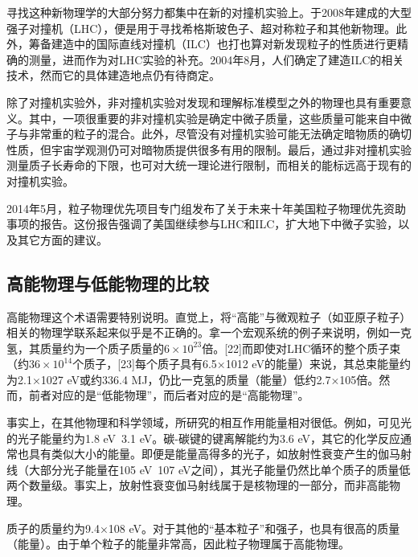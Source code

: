 寻找这种新物理学的大部分努力都集中在新的对撞机实验上。于2008年建成的大型强子对撞机（LHC），便是用于寻找希格斯玻色子、超对称粒子和其他新物理。此外，筹备建造中的国际直线对撞机（ILC）也打也算对新发现粒子的性质进行更精确的测量，进而作为对LHC实验的补充。2004年8月，人们确定了建造ILC的相关技术，然而它的具体建造地点仍有待商定。

除了对撞机实验外，非对撞机实验对发现和理解标准模型之外的物理也具有重要意义。其中，一项很重要的非对撞机实验是确定中微子质量，这些质量可能来自中微子与非常重的粒子的混合。此外，尽管没有对撞机实验可能无法确定暗物质的确切性质，但宇宙学观测仍可对暗物质提供很多有用的限制。最后，通过非对撞机实验测量质子长寿命的下限，也可对大统一理论进行限制，而相关的能标远高于现有的对撞机实验。

2014年5月，粒子物理优先项目专门组发布了关于未来十年美国粒子物理优先资助事项的报告。这份报告强调了美国继续参与LHC和ILC，扩大地下中微子实验，以及其它方面的建议。

\subsection{高能物理与低能物理的比较}
高能物理这个术语需要特别说明。直觉上，将“高能”与微观粒子（如亚原子粒子）相关的物理学联系起来似乎是不正确的。拿一个宏观系统的例子来说明，例如一克氢，其质量约为一个质子质量的$6\times10^{23}$倍。[22]而即使对LHC循环的整个质子束（约3$6\times10^{14}$个质子，[23]每个质子具有6.5×1012 eV的能量）来说，其总束能量约为2.1×1027 eV或约336.4 MJ，仍比一克氢的质量（能量）低约2.7×105倍。然而，前者对应的是“低能物理”，而后者对应的是“高能物理”。

事实上，在其他物理和科学领域，所研究的相互作用能量相对很低。例如，可见光的光子能量约为1.8 eV~3.1 eV。碳-碳键的键离解能约为3.6 eV，其它的化学反应通常也具有类似大小的能量。即便是能量高得多的光子，如放射性衰变产生的伽马射线（大部分光子能量在105 eV~107 eV之间），其光子能量仍然比单个质子的质量低两个数量级。事实上，放射性衰变伽马射线属于是核物理的一部分，而非高能物理。

质子的质量约为9.4×108 eV。对于其他的“基本粒子”和强子，也具有很高的质量（能量）。由于单个粒子的能量非常高，因此粒子物理属于高能物理。